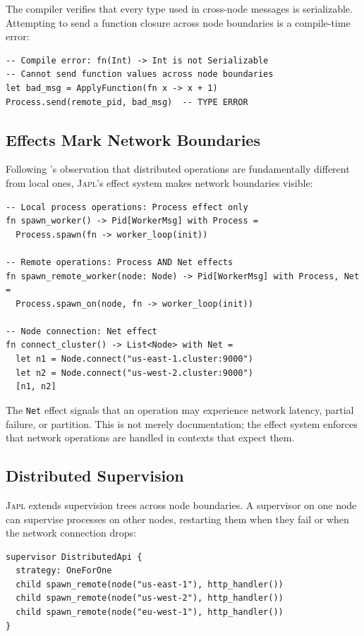 \documentclass[11pt,a4paper]{article}
\newcommand{\japl}{\textsc{Japl}}
\begin{document}
The compiler verifies that every type used in cross-node messages is
serializable. Attempting to send a function closure across node boundaries
is a compile-time error:

\begin{lstlisting}
-- Compile error: fn(Int) -> Int is not Serializable
-- Cannot send function values across node boundaries
let bad_msg = ApplyFunction(fn x -> x + 1)
Process.send(remote_pid, bad_msg)  -- TYPE ERROR
\end{lstlisting}

\subsection{Effects Mark Network Boundaries}

Following \citeauthor{waldo1996note}'s observation that distributed
operations are fundamentally different from local ones, \japl{}'s effect
system makes network boundaries visible:

\begin{lstlisting}
-- Local process operations: Process effect only
fn spawn_worker() -> Pid[WorkerMsg] with Process =
  Process.spawn(fn -> worker_loop(init))

-- Remote operations: Process AND Net effects
fn spawn_remote_worker(node: Node) -> Pid[WorkerMsg] with Process, Net =
  Process.spawn_on(node, fn -> worker_loop(init))

-- Node connection: Net effect
fn connect_cluster() -> List<Node> with Net =
  let n1 = Node.connect("us-east-1.cluster:9000")
  let n2 = Node.connect("us-west-2.cluster:9000")
  [n1, n2]
\end{lstlisting}

The \texttt{Net} effect signals that an operation may experience network
latency, partial failure, or partition. This is not merely documentation;
the effect system enforces that network operations are handled in contexts
that expect them.

\subsection{Distributed Supervision}

\japl{} extends supervision trees across node boundaries. A supervisor on
one node can supervise processes on other nodes, restarting them when they
fail or when the network connection drops:

\begin{lstlisting}
supervisor DistributedApi {
  strategy: OneForOne
  child spawn_remote(node("us-east-1"), http_handler())
  child spawn_remote(node("us-west-2"), http_handler())
  child spawn_remote(node("eu-west-1"), http_handler())
}
\end{lstlisting}
\end{document}
